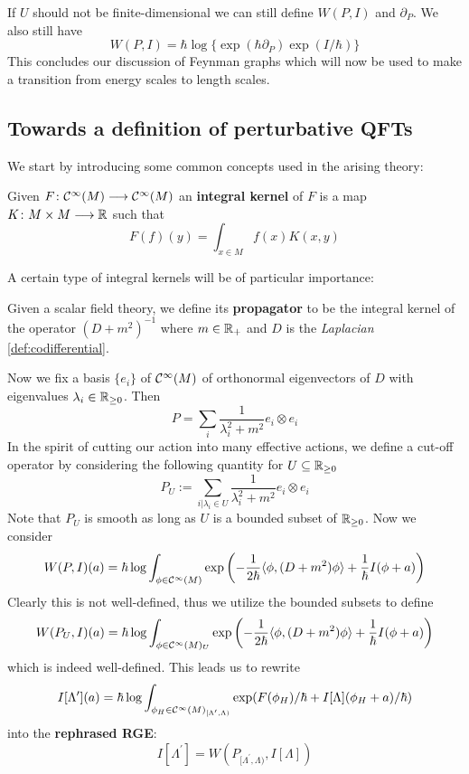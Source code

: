 If $U$ should not be finite-dimensional we can still define $W(P,I)$ and $\partial_P$. We also still have
$$ W(P,I) = \hbar \log\{ \exp(\hbar \partial_P) \exp(I/\hbar) \} $$
This concludes our discussion of Feynman graphs which will now be used to make a transition from energy scales to length scales.

\subsection{Towards a definition of perturbative QFTs}

We start by introducing some common concepts used in the arising theory:

\begin{definition}
  Given $F\colon \mathcal{C}^{\infty}(M) \longrightarrow \mathcal{C}^{\infty}(M)$ an \textbf{integral kernel} of $F$ is a map $K \colon M \times M \longrightarrow \mathbb{R}$ such that
  $$ F(f)(y) = \int_{x \in M} f(x) K(x,y) $$
\end{definition}

A certain type of integral kernels will be of particular importance:

\begin{definition}[Propagators]
  Given a scalar field theory, we define its \textbf{propagator} to be the integral kernel of the operator $(D+m^2)^{-1}$ where $m \in \mathbb{R}_+$ and $D$ is the \emph{Laplacian} \ref{def:codifferential}.
\end{definition}

Now we fix a basis $\{e_i\}$ of $\mathcal{C}^{\infty}(M)$ of orthonormal eigenvectors of $D$ with eigenvalues $\lambda_i \in \mathbb{R}_{\geq 0}$. Then
$$ P = \sum_i \frac{1}{\lambda_i^2 + m^2} e_i \otimes e_i $$
In the spirit of cutting our action into many effective actions, we define a cut-off operator by considering the following quantity for $U \subseteq \mathbb{R}_{\geq 0}$
$$ P_U := \sum_{i|\lambda_i \in U} \frac{1}{\lambda_i^2 + m^2} e_i \otimes e_i $$
Note that $P_U$ is smooth as long as $U$ is a bounded subset of $\mathbb{R}_{\geq 0}$. Now we consider
$$ W(P,I)(a) = \hbar \log \int_{\phi \in \Ci(M)} \exp\left( - \frac{1}{2\hbar} \langle \phi, (D+m^2) \phi \rangle + \frac{1}{\hbar} I(\phi +a) \right) $$
Clearly this is not well-defined, thus we utilize the bounded subsets to define
$$ W(P_U,I)(a) = \hbar \log \int_{\phi \in \Ci(M)_U} \exp\left( - \frac{1}{2\hbar} \langle \phi, (D+m^2) \phi \rangle + \frac{1}{\hbar} I(\phi +a) \right) $$
which is indeed well-defined. This leads us to rewrite
$$ I[\Lambda^\prime](a) = \hbar \log \int_{\phi_H \in \Ci(M)_{[\Lambda^\prime, \Lambda)}} \exp(F(\phi_H) / \hbar + I[\Lambda](\phi_H + a)/\hbar) $$
into the \textbf{rephrased RGE}:
\begin{equation}
\label{eq:RGE_2}\tag{RGE}
I[\Lambda^\prime] = W \left( P_{[\Lambda^\prime, \Lambda)}, I[\Lambda] \right)
\end{equation}

